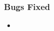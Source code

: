 \documentclass[12pt]{article}
\newcommand{\most}[0]{{MOST}}
\numberwithin{equation}{section}
\numberwithin{table}{section}
\numberwithin{figure}{section}
\begin{document}
\begin{appendices}
\subsubsection*{Bugs Fixed}
\begin{itemize}
\item 
\end{itemize}

% 
% 
% 
% 
% 

\end{appendices}
\end{document}
